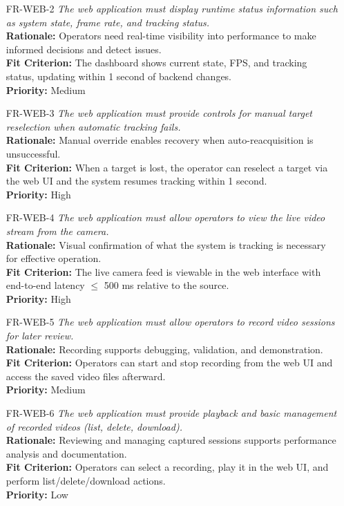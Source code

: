\documentclass[12pt]{article}
\begin{document}
\begin{itemize}
  \item[FR-WEB-2] \emph{The web application must display runtime status information
          such as system state, frame rate, and tracking status.}\\[2mm]
        {\bf Rationale:} Operators need real-time visibility into performance to make informed decisions and detect issues.\\
        {\bf Fit Criterion:} The dashboard shows current state, FPS, and tracking status, updating within 1 second of backend changes.\\
        {\bf Priority:} Medium

  \item[FR-WEB-3] \emph{The web application must provide controls for manual target
          reselection when automatic tracking fails.}\\[2mm]
        {\bf Rationale:} Manual override enables recovery when auto-reacquisition is unsuccessful.\\
        {\bf Fit Criterion:} When a target is lost, the operator can reselect a target via the web UI and the system resumes tracking within 1 second.\\
        {\bf Priority:} High

  \item[FR-WEB-4] \emph{The web application must allow operators to view the live video
          stream from the camera.}\\[2mm]
        {\bf Rationale:} Visual confirmation of what the system is tracking is necessary for effective operation.\\
        {\bf Fit Criterion:} The live camera feed is viewable in the web interface with end-to-end latency $\leq$ 500 ms relative to the source.\\
        {\bf Priority:} High

  \item[FR-WEB-5] \emph{The web application must allow operators to record video
          sessions for later review.}\\[2mm]
        {\bf Rationale:} Recording supports debugging, validation, and demonstration.\\
        {\bf Fit Criterion:} Operators can start and stop recording from the web UI and access the saved video files afterward.\\
        {\bf Priority:} Medium

  \item[FR-WEB-6] \emph{The web application must provide playback and basic management
          of recorded videos (list, delete, download).}\\[2mm]
        {\bf Rationale:} Reviewing and managing captured sessions supports performance analysis and documentation.\\
        {\bf Fit Criterion:} Operators can select a recording, play it in the web UI, and perform list/delete/download actions.\\
        {\bf Priority:} Low

\end{itemize}
\end{document}
